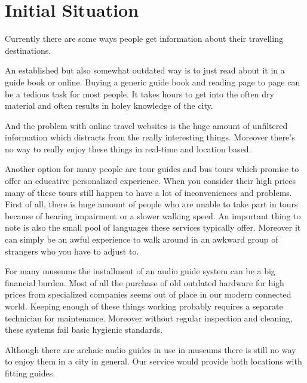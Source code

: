 \documentclass[12pt]{article}
\theoremstyle{definition}
\newenvironment{text}{
}{}
\begin{document}
\section{Initial Situation}
\begin{text}
Currently there are some ways people get information about their travelling destinations.\newline

An established but also somewhat outdated way is to just read about it in a guide book or online.
Buying a generic guide book and reading page to page can be a tedious task for most people. It takes hours to get into the often dry material and often results in holey knowledge of the city.\newline

And the problem with online travel websites is the huge amount of unfiltered information which distracts from the really interesting things. Moreover there's no way to really enjoy these things in real-time and location based.\newline
 
Another option for many people are tour guides and bus tours which promise to offer an educative personalized experience. %
When you consider their high prices many of these tours still happen to have a lot of inconveniences and problems. First of all, there is huge amount of people who are unable to take part in tours because of hearing impairment or a slower walking speed. An important thing to note is also the small pool of languages these services typically offer. Moreover it can simply be an awful experience to walk around in an awkward group of strangers who you have to adjust to.\newline
 
For many museums the installment of an audio guide system can be a big financial burden. Most of all the purchase of old outdated hardware for high prices from specialized companies seems out of place in our modern connected world. Keeping enough of these things working probably requires a separate technician for maintenance.
Moreover without regular inspection and cleaning, these systems fail basic hygienic standards. \newline

Although there are archaic audio guides in use in museums there is still no way to enjoy them in a city in general. Our service would provide both locations with fitting guides.
 
\end{text}
 
\end{document}
